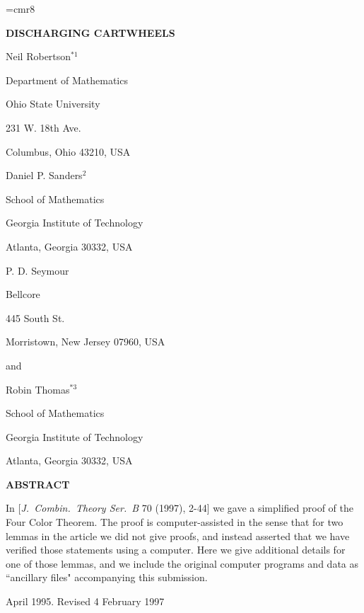 \font\smallrm=cmr8
\def\ell{l}
\def\st{\,:\,}
\let\ppar\par
\def\reffc{1}

\nopagenumbers
\phantom{a}
\bigskip
\centerline{\bf DISCHARGING CARTWHEELS}
\bigskip\bigskip
\baselineskip=11pt

\centerline{Neil Robertson$^{*1}$
}
\centerline{Department of Mathematics}
\centerline{Ohio State University}
\centerline{231 W. 18th Ave.}
\centerline{Columbus, Ohio  43210, USA}
\bigskip

\centerline{Daniel P. Sanders$^{2}$}
\centerline{School of Mathematics}
\centerline{Georgia Institute of Technology}
\centerline{Atlanta, Georgia  30332, USA}
\bigskip

\centerline{P. D. Seymour}
\centerline{Bellcore}
\centerline{445 South St.}
\centerline{Morristown, New Jersey  07960, USA}
\bigskip

\centerline{and}
\bigskip

\centerline{Robin Thomas$^{*3}$}
\centerline{School of Mathematics}
\centerline{Georgia Institute of Technology}
\centerline{Atlanta, Georgia  30332, USA}
\bigskip\bigskip\bigskip

\centerline{\bf ABSTRACT}
\bigskip

\noindent
In [{\it J.~Combin.\ Theory Ser.\ B} 70 (1997), 2-44] we gave a simplified proof
of the Four Color Theorem. The proof is computer-assisted in the sense
that for two lemmas in the article we did not give proofs, and instead
asserted that we have verified those statements using a computer. Here
we give additional details for one of those lemmas, and we include the
original computer programs and data as ``ancillary files" accompanying this
submission. 


\vfill
{} April 1995.
 Revised  4 February 1997
\vfil
\eject

